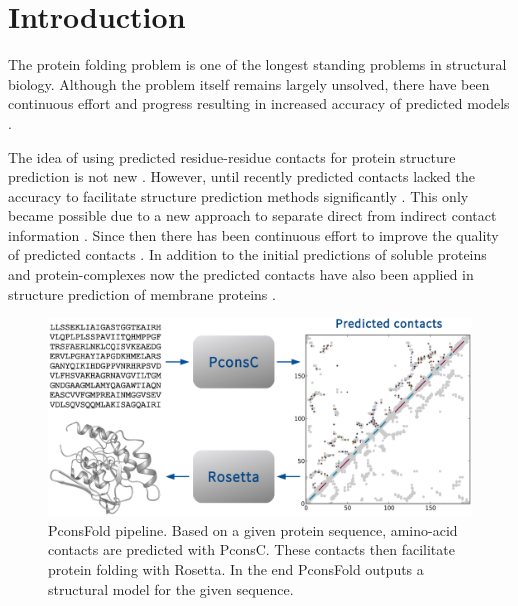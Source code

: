 \documentclass{bioinfo}
\begin{document}
\section{Introduction}
The protein folding problem is one of the longest standing problems in
structural biology. Although the problem itself remains largely unsolved,
there have been continuous effort and progress resulting in increased
accuracy of predicted models
\cite[]{kryshtafovych_CASP10_2013}. 

The idea of using predicted residue-residue contacts for protein
structure prediction is not new \cite[]{Vendruscolo9377713}. However,
until recently predicted contacts lacked the accuracy to facilitate
structure prediction methods significantly
\cite[]{marks_protein_2011}. This only became possible due to a new
approach to separate direct from indirect contact information
\cite[]{Weigt19116270,burger_disentangling_2010}. Since then there
has been continuous effort to improve the quality of predicted
contacts \cite[]{morcos_direct-coupling_2011, jones_PSICOV:_2012,
 ekeberg_improved_2013, skwark_PconsC:_2013}. In addition to the
initial predictions of soluble proteins \cite[]{marks_protein_2011}
and protein-complexes \cite{Schug20018738} now the predicted contacts
have also been applied in structure prediction of membrane proteins
\cite[]{hopf_three-dimensional_2012, nugent_accurate_2012}.


\begin{figure}[!tpb]%
\centerline{\includegraphics[scale=0.35]{figures/pipeline.eps}}
\caption{PconsFold pipeline. Based on a given protein sequence,
 amino-acid contacts are predicted with PconsC. These contacts then
 facilitate protein folding with Rosetta. In the end PconsFold
 outputs a structural model for the given
 sequence.}\label{fig:pipeline} 
\end{figure}
\end{document}
